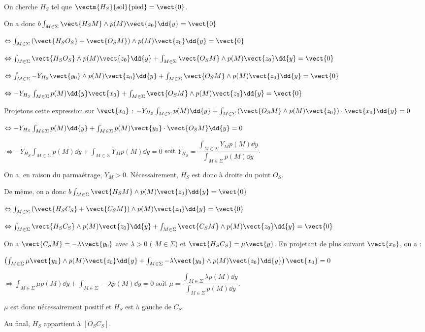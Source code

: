 \ifprof
\begin{corrige}
On cherche $H_S$  tel que $ \vectm{H_S}{\text{sol}}{\text{pied}} =\vect{0}$.


On a donc $ b \int_{M\in\Sigma} \vect{H_S M} \wedge p(M)\vect{z_0} \dd {y}= \vect{0}$

$ \Leftrightarrow \int_{M\in\Sigma}\left( \vect{H_S O_S}+\vect{O_S M} \right)\wedge p(M)\vect{z_0} \dd {y}= \vect{0}$


$ \Leftrightarrow \int_{M\in\Sigma} \vect{H_S O_S}\wedge p(M)\vect{z_0} \dd {y} +\int_{M\in\Sigma}\vect{O_S M}\wedge p(M)\vect{z_0} \dd {y}  = \vect{0}$


$ \Leftrightarrow \int_{M\in\Sigma} -Y_{H_S}\vect{y_0}\wedge p(M)\vect{z_0} \dd {y} +\int_{M\in\Sigma}\vect{O_S M}\wedge p(M)\vect{z_0} \dd {y}  = \vect{0}$


$ \Leftrightarrow -Y_{H_S}\int_{M\in\Sigma}  p(M) \dd {y}\vect{x_0} +\int_{M\in\Sigma}\vect{O_S M}\wedge p(M)\vect{z_0} \dd {y}  = \vect{0}$

Projetons cette expression sur $\vect{x_0}$ :
$  -Y_{H_S}\int_{M\in\Sigma}  p(M) \dd {y} +\int_{M\in\Sigma}\left(\vect{O_S M}\wedge p(M)\vect{z_0}\right)\cdot \vect{x_0} \dd {y}  = {0}$

$  \Leftrightarrow -Y_{H_S}\int_{M\in\Sigma}  p(M) \dd {y} +\int_{M\in\Sigma}p(M)\vect{y_0}\cdot \vect{O_S M} \dd {y}  = {0}$

$  \Leftrightarrow -Y_{H_S}\int_{M\in\Sigma}  p(M) \dd {y} +\int_{M\in\Sigma} Y_Mp(M) \dd {y}  = {0}$ soit 
$  Y_{H_S}  = \dfrac{\int_{M\in\Sigma} Y_Mp(M) \dd {y}}{\int_{M\in\Sigma}  p(M) \dd {y}}  $.

On a, en raison du parmaétrage, $Y_M > 0$. 
Nécessairement, $H_S$ est donc à droite du point $O_S$. 


De même, on a donc $ b \int_{M\in\Sigma} \vect{H_S M} \wedge p(M)\vect{z_0} \dd {y}= \vect{0}$

$ \Leftrightarrow \int_{M\in\Sigma}\left( \vect{H_S C_S}+\vect{C_S M} \right)\wedge p(M)\vect{z_0} \dd {y}= \vect{0}$


$ \Leftrightarrow \int_{M\in\Sigma} \vect{H_S C_S}\wedge p(M)\vect{z_0} \dd {y} +\int_{M\in\Sigma}\vect{C_S M}\wedge p(M)\vect{z_0} \dd {y}  = \vect{0}$

On a $\vect{C_SM}= - \lambda \vect{y_0}$ avec $\lambda>0$ ( $M\in \Sigma$) et $\vect{H_S C_S} = \mu \vect{y}$. En projetant de plus suivant $\vect{x_0}$, on a : 

$ \left(\int_{M\in\Sigma}\mu \vect{y_0} \wedge p(M)\vect{z_0} \dd {y} +\int_{M\in\Sigma}- \lambda \vect{y_0} \wedge p(M)\vect{z_0} \dd {y}\right)\vect{x_0}  = {0}$

$ \Rightarrow \int_{M\in\Sigma}\mu p(M) \dd {y} +\int_{M\in\Sigma}- \lambda  p(M)\dd {y}  = {0}$
soit $  \mu  =\dfrac{ \int_{M\in\Sigma} \lambda  p(M)\dd {y}}{\int_{M\in\Sigma} p(M) \dd {y}} $.

$\mu$ est donc nécessairement positif et $H_S$ est à gauche de $C_S$. 

Au final, $H_S$ appartient à $\left[O_S C_S \right]$.




\end{corrige}
